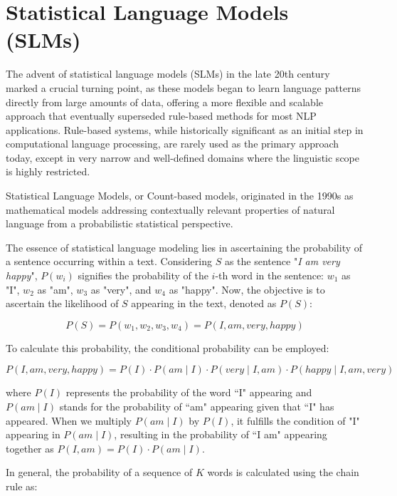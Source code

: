 \section{Statistical Language Models (SLMs)}

The advent of statistical language models (SLMs) in the late 20th century marked a crucial turning point, as these models began to learn language patterns directly from large amounts of data, offering a more flexible and scalable approach that eventually superseded rule-based methods for most NLP applications. Rule-based systems, while historically significant as an initial step in computational language processing, are rarely used as the primary approach today, except in very narrow and well-defined domains where the linguistic scope is highly restricted.

Statistical Language Models, or Count-based models, originated in the 1990s as mathematical models addressing contextually relevant properties of natural language from a probabilistic statistical perspective. 

The essence of statistical language modeling lies in ascertaining the probability of a sentence occurring within a text. Considering $S$ as the sentence "\textit{I am very happy}", $P(w_i)$ signifies the probability of the $i$-th word in the sentence: $w_1$ as "I", $w_2$ as "am", $w_3$ as "very", and $w_4$ as "happy". Now, the objective is to ascertain the likelihood of $S$ appearing in the text, denoted as $P(S)$:

\begin{equation}
P(S) = P(w_1, w_2, w_3, w_4) = P(I, am, very, happy)
\end{equation}

\noindent To calculate this probability, the conditional probability can be employed:

\begin{equation}
P(I, am, very, happy) = P(I) \cdot P(am \mid I) \cdot P(very \mid I, am) \cdot P(happy \mid I, am, very)
\end{equation}

\noindent where $P(I)$ represents the probability of the word ``I" appearing and $P(am \mid I)$ stands for the probability of ``am" appearing given that ``I" has appeared. When we multiply $P(am \mid I)$ by $P(I)$, it fulfills the condition of "I" appearing in $P(am \mid I)$, resulting in the probability of ``I am" appearing together as $P(I, am) = P(I) \cdot P(am \mid I)$. 

\noindent In general, the probability of a sequence of $K$ words is calculated using the chain rule as:

